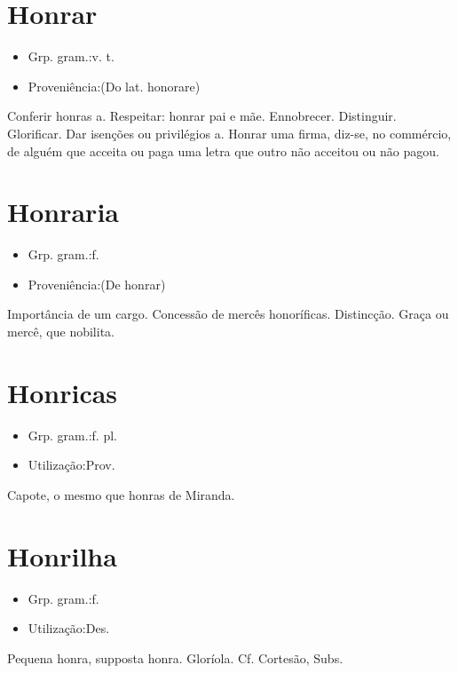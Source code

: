 \documentclass{article}
\begin{document}
\section{Honrar}
\begin{itemize}
\item {Grp. gram.:v. t.}
\end{itemize}
\begin{itemize}
\item {Proveniência:(Do lat. \textunderscore honorare\textunderscore )}
\end{itemize}
Conferir honras a.
Respeitar: \textunderscore honrar pai e mãe\textunderscore .
Ennobrecer.
Distinguir.
Glorificar.
Dar isenções ou privilégios a.
\textunderscore Honrar uma firma\textunderscore , diz-se, no commércio, de alguém que acceita ou paga uma letra que outro não acceitou ou não pagou.
\section{Honraria}
\begin{itemize}
\item {Grp. gram.:f.}
\end{itemize}
\begin{itemize}
\item {Proveniência:(De \textunderscore honrar\textunderscore )}
\end{itemize}
Importância de um cargo.
Concessão de mercês honoríficas.
Distincção.
Graça ou mercê, que nobilita.
\section{Honricas}
\begin{itemize}
\item {Grp. gram.:f. pl.}
\end{itemize}
\begin{itemize}
\item {Utilização:Prov.}
\end{itemize}
Capote, o mesmo que \textunderscore honras de Miranda\textunderscore .
\section{Honrilha}
\begin{itemize}
\item {Grp. gram.:f.}
\end{itemize}
\begin{itemize}
\item {Utilização:Des.}
\end{itemize}
Pequena honra, supposta honra.
Gloríola. Cf. Cortesão, \textunderscore Subs.\textunderscore 
\end{document}
